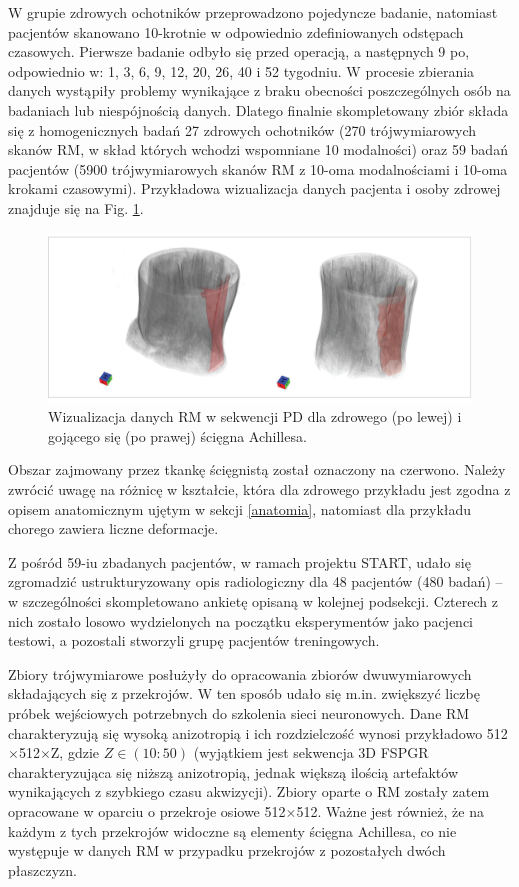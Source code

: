 W grupie zdrowych ochotników przeprowadzono pojedyncze badanie, natomiast pacjentów skanowano 10-krotnie w odpowiednio zdefiniowanych odstępach czasowych. Pierwsze badanie odbyło się przed operacją, a następnych 9 po, odpowiednio w: 1, 3, 6, 9, 12, 20, 26, 40 i 52 tygodniu. W procesie zbierania danych wystąpiły problemy wynikające z braku obecności poszczególnych osób na badaniach lub niespójnością danych. Dlatego finalnie skompletowany zbiór składa się z homogenicznych badań 27 zdrowych ochotników (270 trójwymiarowych skanów RM, w skład których wchodzi wspomniane 10 modalności) oraz 59 badań pacjentów (5900 trójwymiarowych skanów RM z 10-oma modalnościami i 10-oma krokami czasowymi). Przykładowa wizualizacja danych pacjenta i osoby zdrowej znajduje się na Fig. \ref{fig:MRI_sample}. 
\begin{figure}[h!]
	\includegraphics[width=\textwidth]{figures/Data_MRI_sample.jpg}
	\caption{Wizualizacja danych RM w sekwencji PD dla zdrowego (po lewej) i gojącego się (po prawej) ścięgna Achillesa.}
	 \label{fig:MRI_sample}
\end{figure}
Obszar zajmowany przez tkankę ścięgnistą został oznaczony na czerwono. Należy zwrócić uwagę na różnicę w kształcie, która dla zdrowego przykładu jest zgodna z opisem anatomicznym ujętym w sekcji \ref{anatomia}, natomiast dla przykładu chorego zawiera liczne deformacje. 

Z pośród 59-iu zbadanych pacjentów, w ramach projektu START, udało się zgromadzić ustrukturyzowany opis radiologiczny dla 48 pacjentów (480 badań) -- w szczególności skompletowano ankietę opisaną w kolejnej podsekcji. Czterech z nich zostało losowo wydzielonych na początku eksperymentów jako pacjenci testowi, a pozostali stworzyli grupę pacjentów treningowych.

Zbiory trójwymiarowe posłużyły do opracowania zbiorów dwuwymiarowych składających się z przekrojów. W ten sposób udało się m.in. zwiększyć liczbę próbek wejściowych potrzebnych do szkolenia sieci neuronowych. Dane RM charakteryzują się wysoką anizotropią i ich rozdzielczość wynosi przykładowo 512$\times$512$\times$Z, gdzie $Z\in(10:50)$ (wyjątkiem jest sekwencja 3D FSPGR charakteryzująca się niższą anizotropią, jednak większą ilością artefaktów wynikających z szybkiego czasu akwizycji). Zbiory oparte o RM zostały zatem opracowane w oparciu o przekroje osiowe 512$\times$512. Ważne jest również, że na każdym z tych przekrojów widoczne są elementy ścięgna Achillesa, co nie występuje w danych RM w przypadku przekrojów z pozostałych dwóch płaszczyzn.

